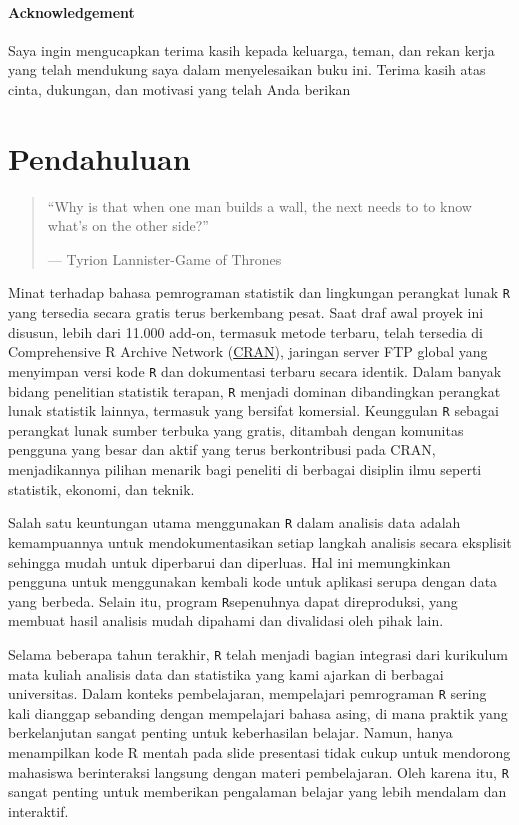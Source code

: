 \documentclass[
  oneside]{book}
\begin{document}
\subsubsection*{Acknowledgement}\label{acknowledgement}

Saya ingin mengucapkan terima kasih kepada keluarga, teman, dan rekan kerja yang telah mendukung saya dalam menyelesaikan buku ini. Terima kasih atas cinta, dukungan, dan motivasi yang telah Anda berikan

\chapter{Pendahuluan}\label{pd}

\begin{quote}
``Why is that when one man builds a wall, the next needs to to know what's on the other side?''

--- Tyrion Lannister-Game of Thrones
\end{quote}

Minat terhadap bahasa pemrograman statistik dan lingkungan perangkat lunak \texttt{R} \citep{R-base} yang tersedia secara gratis terus berkembang pesat. Saat draf awal proyek ini disusun, lebih dari 11.000 add-on, termasuk metode terbaru, telah tersedia di Comprehensive R Archive Network (\href{https://cran.r-project.org/}{CRAN}), jaringan server FTP global yang menyimpan versi kode \texttt{R} dan dokumentasi terbaru secara identik. Dalam banyak bidang penelitian statistik terapan, \texttt{R} menjadi dominan dibandingkan perangkat lunak statistik lainnya, termasuk yang bersifat komersial. Keunggulan \texttt{R} sebagai perangkat lunak sumber terbuka yang gratis, ditambah dengan komunitas pengguna yang besar dan aktif yang terus berkontribusi pada CRAN, menjadikannya pilihan menarik bagi peneliti di berbagai disiplin ilmu seperti statistik, ekonomi, dan teknik.

Salah satu keuntungan utama menggunakan \texttt{R} dalam analisis data adalah kemampuannya untuk mendokumentasikan setiap langkah analisis secara eksplisit sehingga mudah untuk diperbarui dan diperluas. Hal ini memungkinkan pengguna untuk menggunakan kembali kode untuk aplikasi serupa dengan data yang berbeda. Selain itu, program \texttt{R}sepenuhnya dapat direproduksi, yang membuat hasil analisis mudah dipahami dan divalidasi oleh pihak lain.

Selama beberapa tahun terakhir, \texttt{R} telah menjadi bagian integrasi dari kurikulum mata kuliah analisis data dan statistika yang kami ajarkan di berbagai universitas. Dalam konteks pembelajaran, mempelajari pemrograman \texttt{R} sering kali dianggap sebanding dengan mempelajari bahasa asing, di mana praktik yang berkelanjutan sangat penting untuk keberhasilan belajar. Namun, hanya menampilkan kode R mentah pada slide presentasi tidak cukup untuk mendorong mahasiswa berinteraksi langsung dengan materi pembelajaran. Oleh karena itu, \texttt{R} sangat penting untuk memberikan pengalaman belajar yang lebih mendalam dan interaktif.
\end{document}
